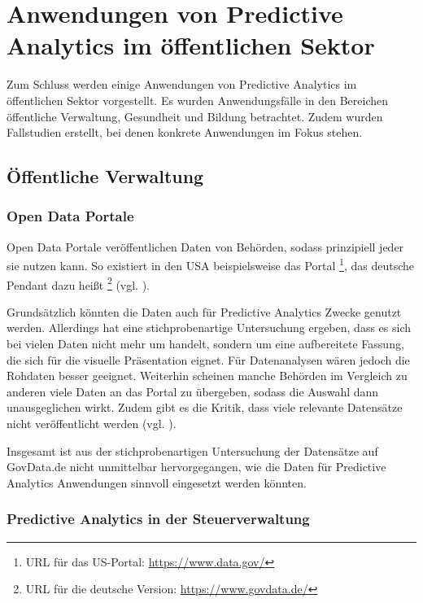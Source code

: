 \chapter{Anwendungen von Predictive Analytics im öffentlichen Sektor}

Zum Schluss werden einige Anwendungen von Predictive Analytics im öffentlichen
Sektor vorgestellt. Es wurden Anwendungsfälle in den Bereichen öffentliche Verwaltung,
Gesundheit und Bildung betrachtet. Zudem wurden Fallstudien erstellt, bei denen
konkrete Anwendungen im Fokus stehen.


\section{Öffentliche Verwaltung}


\subsection{Open Data Portale}

Open Data Portale veröffentlichen Daten von Behörden, sodass prinzipiell jeder
sie nutzen kann. So existiert in den USA beispielsweise das Portal \grqq{}\footnote{
URL für das US-Portal: \url{https://www.data.gov/}
}, das deutsche Pendant dazu heißt \grqq{}\footnote{
URL für die deutsche Version: \url{https://www.govdata.de/} 
} (vgl. \cite{Borchers}). 

Grundsätzlich könnten die Daten auch für Predictive Analytics Zwecke genutzt werden.
Allerdings hat eine stichprobenartige Untersuchung ergeben, dass es sich bei vielen Daten
nicht mehr um \grqq{} handelt, sondern um eine aufbereitete Fassung, die sich
für die visuelle Präsentation eignet. Für Datenanalysen wären jedoch die Rohdaten besser geeignet.
Weiterhin scheinen manche Behörden im Vergleich zu anderen viele Daten an das Portal zu übergeben,
sodass die Auswahl dann unausgeglichen wirkt. Zudem gibt es die Kritik, dass viele relevante
Datensätze nicht veröffentlicht werden (vgl. \cite{Krempl}).


Insgesamt ist aus der stichprobenartigen Untersuchung der Datensätze auf GovData.de nicht unmittelbar
hervorgegangen, wie die Daten für Predictive Analytics Anwendungen sinnvoll eingesetzt werden könnten. 

\subsection{Predictive Analytics in der Steuerverwaltung}

